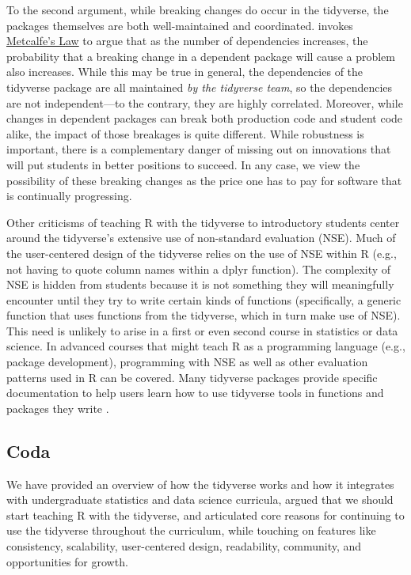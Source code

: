 \documentclass[12pt]{article}
\begin{document}
To the second argument, while breaking changes do occur in the
tidyverse, the packages themselves are both well-maintained and
coordinated. \citet{eddelbuettel2018} invokes
\href{https://en.wikipedia.org/wiki/Metcalfe\%27s_law}{Metcalfe's Law}
to argue that as the number of dependencies increases, the probability
that a breaking change in a dependent package will cause a problem also
increases. While this may be true in general, the dependencies of the
tidyverse package are all maintained \emph{by the tidyverse team}, so
the dependencies are not independent---to the contrary, they are highly
correlated. Moreover, while changes in dependent packages can break both
production code and student code alike, the impact of those breakages is
quite different. While robustness is important, there is a complementary
danger of missing out on innovations that will put students in better
positions to succeed. In any case, we view the possibility of these
breaking changes as the price one has to pay for software that is
continually progressing.

Other criticisms of teaching R with the tidyverse to introductory
students center around the tidyverse's extensive use of non-standard
evaluation (NSE). Much of the user-centered design of the tidyverse
relies on the use of NSE within R (e.g., not having to quote column
names within a dplyr function). The complexity of NSE is hidden from
students because it is not something they will meaningfully encounter
until they try to write certain kinds of functions (specifically, a
generic function that uses functions from the tidyverse, which in turn
make use of NSE). This need is unlikely to arise in a first or even
second course in statistics or data science. In advanced courses that
might teach R as a programming language (e.g., package development),
programming with NSE as well as other evaluation patterns used in R can
be covered. Many tidyverse packages provide specific documentation to
help users learn how to use tidyverse tools in functions and packages
they write \citep{programdplyr, ggplot2inpackage}.

\hypertarget{coda}{%
\subsection{Coda}\label{coda}}

We have provided an overview of how the tidyverse works and how it
integrates with undergraduate statistics and data science curricula,
argued that we should start teaching R with the tidyverse, and
articulated core reasons for continuing to use the tidyverse throughout
the curriculum, while touching on features like consistency,
scalability, user-centered design, readability, community, and
opportunities for growth.
\end{document}
